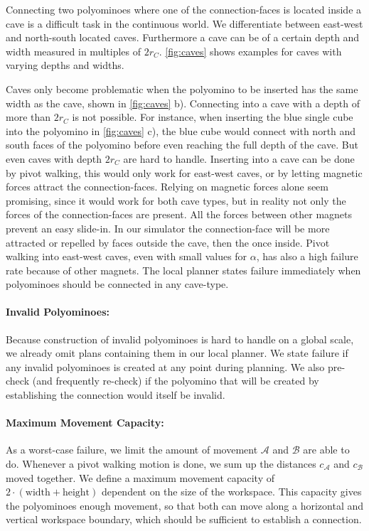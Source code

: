 Connecting two polyominoes where one of the connection-faces is located inside a cave is a difficult task in the continuous world.
We differentiate between east-west and north-south located caves.
Furthermore a cave can be of a certain depth and width measured in multiples of $2 r_C$.
\autoref{fig:caves} shows examples for caves with varying depths and widths.

Caves only become problematic when the polyomino to be inserted has the same width as the cave, shown in \autoref{fig:caves} b).
Connecting into a cave with a depth of more than $2 r_C$ is not possible.
For instance, when inserting the blue single cube into the polyomino in \autoref{fig:caves} c), the blue cube would connect with north and south faces of the polyomino before even reaching the full depth of the cave.
But even caves with depth $2 r_C$ are hard to handle.
Inserting into a cave can be done by pivot walking, this would only work for east-west caves, or by letting magnetic forces attract the connection-faces.
Relying on magnetic forces alone seem promising, since it would work for both cave types, but in reality not only the forces of the connection-faces are present.
All the forces between other magnets prevent an easy slide-in.
In our simulator the connection-face will be more attracted or repelled by faces outside the cave, then the once inside.
Pivot walking into east-west caves, even with small values for $\alpha$, has also a high failure rate because of other magnets.
The local planner states failure immediately when polyominoes should be connected in any cave-type.

\paragraph{Invalid Polyominoes:}

Because construction of invalid polyominoes is hard to handle on a global scale, we already omit plans containing them in our local planner.
We state failure if any invalid polyominoes is created at any point during planning.
We also pre-check (and frequently re-check) if the polyomino that will be created by establishing the connection would itself be invalid. 

\paragraph{Maximum Movement Capacity:}

As a worst-case failure, we limit the amount of movement $\mathcal{A}$ and $\mathcal{B}$ are able to do.
Whenever a pivot walking motion is done, we sum up the distances $c_\mathcal{A}$ and $c_\mathcal{B}$ moved together.
We define a maximum movement capacity of $2\cdot(\text{width} + \text{height})$ dependent on the size of the workspace.
This capacity gives the polyominoes enough movement, so that both can move along a horizontal and vertical workspace boundary, which should be sufficient to establish a connection.


